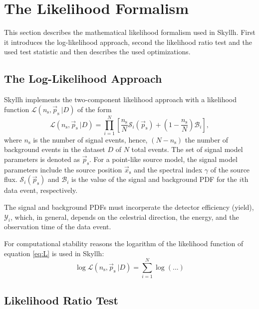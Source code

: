 \documentclass{article}
\newcommand{\ns}{n_{\mathrm{s}}}
\newcommand{\ps}{\vec{p}_{\mathrm{s}}}
\newcommand{\xs}{\vec{x}_{\mathrm{s}}}
\begin{document}
\section{The Likelihood Formalism}

This section describes the mathematical likelihood formalism used in Skyllh.
First it introduces the log-likelihood approach, second the likelihood ratio
test and the used test statistic and then describes the used optimizations.

\subsection{The Log-Likelihood Approach}

Skyllh implements the two-component likelihood approach with a likelihood
function $\mathcal{L}(n_{\mathrm{s}},\vec{p}_{\mathrm{s}}~|D)$ of the form
\begin{equation}
 \mathcal{L}(\ns,\ps~|D) = \prod_{i=1}^{N}\left[ \frac{\ns}{N} \mathcal{S}_{i}(\ps) + (1 - \frac{\ns}{N}) \mathcal{B}_{i} \right],
\label{eq:L}
\end{equation}
where $\ns$ is the number of signal events, hence, $(N-\ns)$ the number of
background events in the dataset $D$ of $N$ total events.
The set of signal model parameters is denoted as $\ps$. For a point-like source
model, the signal model parameters include the source position $\xs$ and the
spectral index $\gamma$ of the source flux.
$\mathcal{S}_i(\ps)$ and $\mathcal{B}_i$ is the value of the signal and background PDF for the $i$th data
event, respectively.

The signal and background PDFs must incorperate the detector efficiency (yield),
$\mathcal{Y}_i$, which, in general, depends on the celestrial direction, the
energy, and the observation time of the data event.

For computational stability reasons the logarithm of the likelihood function of
equation \ref{eq:L} is used in Skyllh:
\begin{equation}
 \log \mathcal{L}(\ns,\ps~|D) = \sum_{i=1}^{N} \log (...)
\end{equation}

\subsection{Likelihood Ratio Test}
\end{document}
